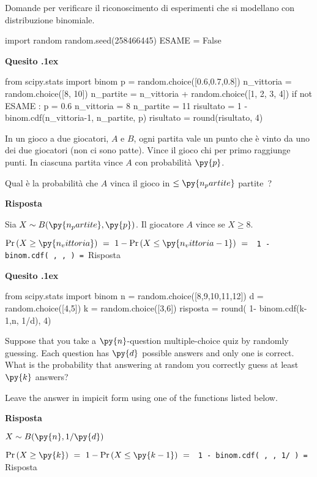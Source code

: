 \documentclass[11pt,twoside,a4paper]{article}
\newcounter{quesito}
\newenvironment{question}{\bigskip\addtocounter{quesito}{1}\bigskip\bigskip\par\textbf{Quesito \thequesito.\kern1ex}}{\vspace{\parskip}}
\newenvironment{answer}{\par\textbf{Risposta\quad}}{\vspace{\parskip}}
\begin{document}
\colorbox{blue!10}{\begin{minipage}{\textwidth}
Domande  per verificare il riconoscimento di esperimenti che si modellano con distribuzione binomiale.
\end{minipage}}

\bigskip\bigskip


\begin{pycode}
import random
random.seed(258466445)
ESAME = False
\end{pycode}


\begin{question}
\def\Pr{{\rm Pr\,}}
\def\Ex{{\rm E\,}}
\def\Var{{\rm Var\,}}
\begin{pycode}
from scipy.stats import binom
p = random.choice([0.6,0.7,0.8])
n_vittoria = random.choice([8, 10])
n_partite = n_vittoria + random.choice([1, 2, 3, 4])
if not ESAME :
   p = 0.6
   n_vittoria = 8
   n_partite = 11
risultato = 1 - binom.cdf(n_vittoria-1, n_partite, p)
risultato = round(risultato, 4)
\end{pycode}
In un gioco a due giocatori, $A$ e $B$, ogni partita vale un punto che è vinto da uno dei due giocatori (non ci sono patte). Vince il gioco chi per primo raggiunge  punti. In ciascuna partita vince $A$ con probabilità $\py{p}$.

Qual è la probabilità che $A$ vinca il gioco in $\le\py{n_partite}$ partite~?
\begin{answer}

Sia $X\sim B(\py{n_partite},\py{p})$. Il giocatore $A$ vince se $X\ge 8$. 

$\displaystyle\Pr(X\ge\py{n_vittoria})\ =\ 1-\Pr( X\le\py{n_vittoria-1} )\ =\ ${\tt{\color{blue} 1 - binom.cdf( , ,  ) }=  }{\color{blue}\hfill Risposta}
\end{answer}
\end{question}



\begin{question}
\begin{pycode}
from scipy.stats import binom
n = random.choice([8,9,10,11,12])
d = random.choice([4,5])
k = random.choice([3,6])
risposta = round( 1- binom.cdf(k-1,n, 1/d), 4)
\end{pycode}
Suppose that you take a $\py{n}$-question multiple-choice quiz by randomly guessing. Each question has $\py{d}$ possible answers and only one is correct. What is the probability that answering at random you correctly guess at least $\py{k}$ answers? 

Leave the answer in impicit form using one of the functions listed below.
\begin{answer}

$X\sim B(\py{n}, 1/\py{d})$

$\Pr(X\ge\py{k})\ =\ 1-\Pr(X\le \py{k-1})\ =\ ${\tt{\color{blue}  1 - binom.cdf( , , 1/ )} = }{\color{blue}\hfill Risposta}

\end{answer}
\end{question}
\end{document}
